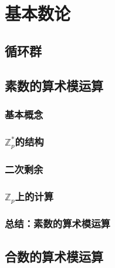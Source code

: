 \chapter{基本数论}\label{chap:A}

\section{循环群}\label{sec:A-1}

\section{素数的算术模运算}\label{sec:A-2}

\subsection{基本概念}\label{subsec:A-2-1}

\subsection{$\mathbb{Z}_p^*$的结构}\label{subsec:A-2-2}

\subsection{二次剩余}\label{subsec:A-2-3}

\subsection{$\mathbb{Z}_p$上的计算}\label{subsec:A-2-4}

\subsection{总结：素数的算术模运算}\label{subsec:A-2-5}

\section{合数的算术模运算}